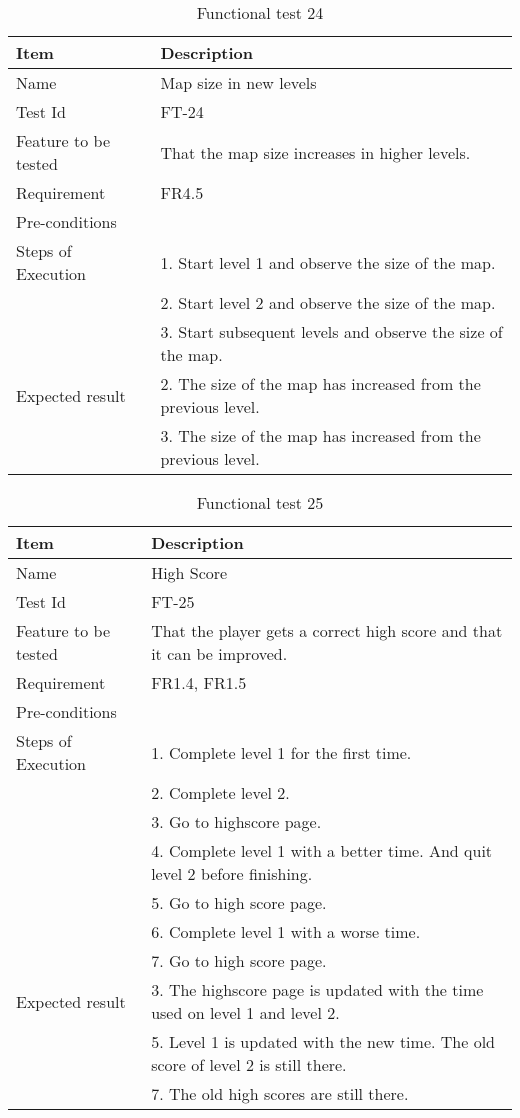 \begin{table}[H]
\centering
	\begin{tabular}{ l | p{8cm} }
		\hline
		{\bf Item} & {\bf Description} \\ \hline
		Name & Map size in new levels \\ 
		Test Id & FT-24 \\ 
		Feature to be tested & That the map size increases in higher levels. \\ 
		Requirement & FR4.5 \\ 
		Pre-conditions & \\ 
		Steps of Execution & 1. Start level 1 and observe the size of the map. \\
		& 2. Start level 2 and observe the size of the map. \\
		& 3. Start subsequent levels and observe the size of the map. \\
		Expected result & 2. The size of the map has increased from the previous level. \\
		& 3. The size of the map has increased from the previous level. \\
	\end{tabular}
	\caption{Functional test 24}
\end{table}

\begin{table}[H]
\centering
	\begin{tabular}{ l | p{8cm} }
		\hline
		{\bf Item} & {\bf Description} \\ \hline
		Name & High Score \\ 
		Test Id & FT-25 \\ 
		Feature to be tested & That the player gets a correct high score and that it can be improved. \\ 
		Requirement & FR1.4, FR1.5 \\ 
		Pre-conditions & \\ 
		Steps of Execution & 1. Complete level 1 for the first time. \\
		& 2. Complete level 2. \\
		& 3. Go to highscore page. \\
		& 4. Complete level 1 with a better time. And quit level 2 before finishing. \\
		& 5. Go to high score page. \\
		& 6. Complete level 1 with a worse time. \\
		& 7. Go to high score page. \\
		Expected result & 3. The highscore page is updated with the time used on level 1 and level 2. \\
		& 5. Level 1 is updated with the new time. The old score of level 2 is still there. \\
		& 7. The old high scores are still there. \\
	\end{tabular}
	\caption{Functional test 25}
\end{table}

